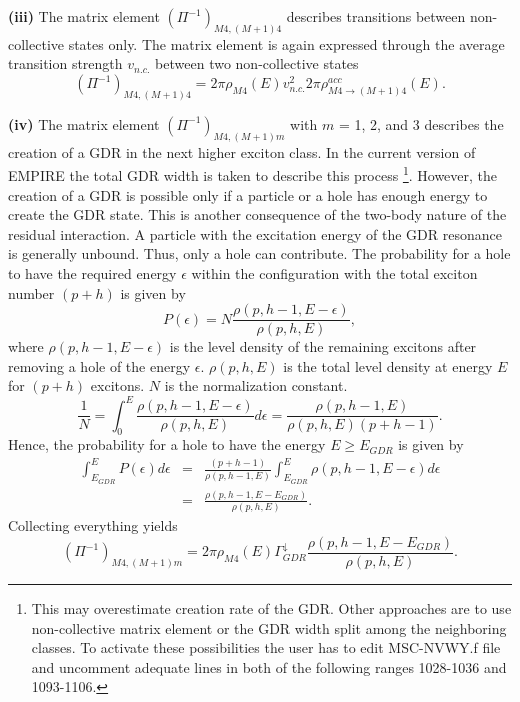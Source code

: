 \documentclass[twocolumn,amsmath,amssymb,10pt,groupedaddress,a4paper]{revtex4}
\begin{document}
\smallskip
\textbf{(iii)} The matrix element $(\Pi^{-1})_{M4,(M+1)4}$ describes
transitions between non-collective states only. The matrix element
is again expressed through the average transition strength $v_{n.c.}$
between two non-collective states \begin{equation}
(\Pi^{-1})_{M4,(M+1)4}=2\pi\rho_{M4}(E)v_{n.c.}^{2}2\pi\rho_{M4\rightarrow(M+1)4}^{acc}(E).\end{equation}

\smallskip
\textbf{(iv)} The matrix element $(\Pi^{-1})_{M4,(M+1)m}$ with $m$
= 1, 2, and 3 describes the creation of a GDR in the next higher exciton
class. In the current version of EMPIRE the total GDR width is taken
to describe this process%
\footnote{This may overestimate creation rate of the GDR. Other approaches are
to use non-collective matrix element or the GDR width split among
the neighboring classes. To activate these possibilities the user
has to edit MSC-NVWY.f file and uncomment
adequate lines in both of the following ranges 1028-1036 and 1093-1106.%
}. However, the creation of a GDR is possible only if a particle or
a hole has enough energy to create the GDR state. This is another
consequence of the two-body nature of the residual interaction. A
particle with the excitation energy of the GDR resonance is generally
unbound. Thus, only a hole can contribute. The probability for a hole
to have the required energy $\epsilon$ within the configuration with
the total exciton number $(p+h)$ is given by \begin{equation}
P(\epsilon)=N\frac{\rho(p,h-1,E-\epsilon)}{\rho(p,h,E)},\end{equation}
where $\rho(p,h-1,E-\epsilon)$ is the level density
of the remaining excitons after removing a hole of the energy $\epsilon$.
$\rho(p,h,E)$ is the total level density at energy $E$ for $(p+h)$
excitons. $N$ is the normalization constant. \begin{equation}
\frac{1}{N}=\int_{0}^{E}\frac{\rho(p,h-1,E-\epsilon)}{\rho(p,h,E)}d\epsilon=\frac{\rho(p,h-1,E)}{\rho(p,h,E)(p+h-1)}.\end{equation}
Hence, the probability for a hole to have the energy $E\geq E_{GDR}$
is given by \begin{eqnarray}
\int_{E_{GDR}}^{E}P(\epsilon)d\epsilon & = & \frac{(p+h-1)}{\rho(p,h-1,E)}\int_{E_{GDR}}^{E}\rho(p,h-1,E-\epsilon)d\epsilon\nonumber \\
 & = & \frac{\rho(p,h-1,E-E_{GDR})}{\rho(p,h,E)}.\end{eqnarray}
Collecting everything yields \begin{equation}
(\Pi^{-1})_{M4,(M+1)m}=2\pi\rho_{M4}(E)\Gamma_{GDR}^{\downarrow}\frac{\rho(p,h-1,E-E_{GDR})}{\rho(p,h,E)}.\end{equation}
\end{document}
